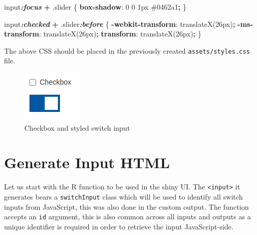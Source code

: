 \documentclass[
]{krantz}
\makeatletter
\newenvironment{Shaded}{\begin{snugshade}}{\end{snugshade}}
\newcommand{\CommentTok}[1]{\textcolor[rgb]{0.37,0.37,0.37}{\textit{#1}}}
\newcommand{\ConstantTok}[1]{\textcolor[rgb]{0,0,0}{#1}}
\newcommand{\ControlFlowTok}[1]{\textcolor[rgb]{0.27,0.27,0.27}{\textbf{#1}}}
\newcommand{\DataTypeTok}[1]{\textcolor[rgb]{0.27,0.27,0.27}{#1}}
\newcommand{\DecValTok}[1]{\textcolor[rgb]{0.06,0.06,0.06}{#1}}
\newcommand{\FunctionTok}[1]{\textcolor[rgb]{0,0,0}{#1}}
\newcommand{\InformationTok}[1]{\textcolor[rgb]{0.37,0.37,0.37}{\textbf{\textit{#1}}}}
\newcommand{\KeywordTok}[1]{\textcolor[rgb]{0.27,0.27,0.27}{\textbf{#1}}}
\newcommand{\NormalTok}[1]{#1}
\newcommand{\OperatorTok}[1]{\textcolor[rgb]{0.43,0.43,0.43}{\textbf{#1}}}
\newcommand{\StringTok}[1]{\textcolor[rgb]{0.5,0.5,0.5}{#1}}
\newenvironment{kframe}{%
\medskip{}
\setlength{\fboxsep}{.8em}
 \def\at@end@of@kframe{}%
 \ifinner\ifhmode%
  \def\at@end@of@kframe{\end{minipage}}%
  \begin{minipage}{\columnwidth}%
 \fi\fi%
 \def\FrameCommand##1{\hskip\@totalleftmargin \hskip-\fboxsep
 \colorbox{shadecolor}{##1}\hskip-\fboxsep
     \hskip-\linewidth \hskip-\@totalleftmargin \hskip\columnwidth}%
 \MakeFramed {\advance\hsize-\width
   \@totalleftmargin\z@ \linewidth\hsize
   \@setminipage}}%
 {\par\unskip\endMakeFramed%
 \at@end@of@kframe}
\renewenvironment{Shaded}{\begin{kframe}}{\end{kframe}}
\makeatother
\begin{document}
\begin{Shaded}
\begin{Highlighting}[]
\NormalTok{input}\InformationTok{:focus} \OperatorTok{+} \FunctionTok{.slider}\NormalTok{ \{}
  \KeywordTok{box{-}shadow}\NormalTok{: }\DecValTok{0} \DecValTok{0} \DecValTok{1}\DataTypeTok{px} \ConstantTok{\#0462a1}\OperatorTok{;}
\NormalTok{\}}

\NormalTok{input}\InformationTok{:checked} \OperatorTok{+} \FunctionTok{.slider}\InformationTok{:before}\NormalTok{ \{}
  \KeywordTok{{-}webkit{-}transform}\NormalTok{: translateX(}\DecValTok{26}\DataTypeTok{px}\NormalTok{)}\OperatorTok{;}
  \KeywordTok{{-}ms{-}transform}\NormalTok{: translateX(}\DecValTok{26}\DataTypeTok{px}\NormalTok{)}\OperatorTok{;}
  \KeywordTok{transform}\NormalTok{: translateX(}\DecValTok{26}\DataTypeTok{px}\NormalTok{)}\OperatorTok{;}
\NormalTok{\}}
\end{Highlighting}
\end{Shaded}

The above CSS should be placed in the previously created \texttt{assets/styles.css} file.

\begin{figure}
\centering
\includegraphics{images/checkbox-switch.png}
\caption{Checkbox and styled switch input}
\end{figure}

\hypertarget{shiny-input-html}{%
\section{Generate Input HTML}\label{shiny-input-html}}

Let us start with the R function to be used in the shiny UI. The \texttt{\textless{}input\textgreater{}} it generates bears a \texttt{switchInput} class which will be used to identify all switch inputs from JavaScript, this was also done in the custom output. The function accepts an \texttt{id} argument, this is also common across all inputs and outputs as a unique identifier is required in order to retrieve the input JavaScript-side.

\begin{Shaded}
\end{Shaded}
\end{document}
